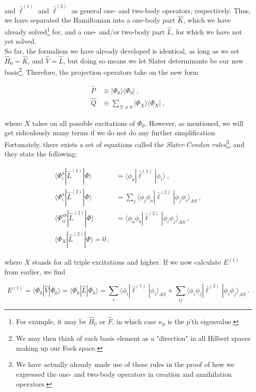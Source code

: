 \documentclass[10pt,twoside]{report}
\begin{document}
	\noindent and $\hat{\ell}^{(1)}$ and $\hat{\ell}^{(2)}$ as general one- and two-body operators, respectively. Thus, we have separated the Hamiltonian into a one-body part $\hat{K}$, which we have already solved\footnote{For example, it may be $\hat{H}_0$ or $\hat{F}$, in which case $\kappa_p$ is the $p$'th eigenvalue.} for, and a one- and/or two-body part $\hat{L}$, for which we have not yet solved.\\
	
	So far, the formalism we have already developed is identical, as long as we set $\hat{H}_0=\hat{K}$, and $\hat{V}=\hat{L}$, but doing so means we let Slater determinants be our new basis\footnote{We may then think of each basis element as a "direction" in all Hilbert spaces making up our Fock space.}. Therefore, the projection operators take on the new form
	
	\begin{align}
		\hat{P} &\equiv |\Phi_0\rangle\langle\Phi_0| \:,\\
		\hat{Q} &\equiv \sum_{X\neq0} |\Phi_X\rangle\langle\Phi_X|\:,
	\end{align}
	
	\noindent where $X$ takes on all possible excitations of $\Phi_0$.
	However, as mentioned, we will get ridiculously many terms if we do not do any further simplification.\\
	
	Fortunately, there exists a set of equations called the \emph{Slater-Condon rules}\footnote{We have actually already made use of these rules in the proof of how we expressed the one- and two-body operators in creation and annihilation operators.}, and they state the following:
	
	\begin{align}
		\langle\Phi_i^a|\hat{L}^{(1)}|\Phi\rangle &= \langle\phi_a|\hat{\ell}^{(1)}|\phi_i\rangle \:,\\
		\langle\Phi_i^a|\hat{L}^{(2)}|\Phi\rangle &= \sum_{j}\langle\phi_j\phi_a|\hat{\ell}^{(2)}|\phi_j\phi_i\rangle_{AS} \:,\\
		\langle\Phi_{ij}^{ab}|\hat{L}^{(2)}|\Phi\rangle &= \langle\phi_a\phi_b|\hat{\ell}^{(2)}|\phi_i\phi_j\rangle_{AS} \:,\\
		\langle\Phi_X|\hat{L}^{(2)}|\Phi\rangle = 0\:,
	\end{align}
	
	\noindent where $X$ stands for all triple excitations and higher. If we now calculate $E^{(1)}$ from earlier, we find
	
	\begin{equation}
		E^{(1)} = \langle\Phi_0|\hat{V}|\Phi_0\rangle = \langle\Phi_0|\hat{L}|\Phi_0\rangle = \sum_{i}\langle\phi_i|\hat{\ell}^{(1)}|\phi_i\rangle_{AS} + \sum_{ij}\langle\phi_i\phi_j|\hat{\ell}^{(2)}|\phi_i\phi_j\rangle_{AS} \:.
	\end{equation}
	
\end{document}
